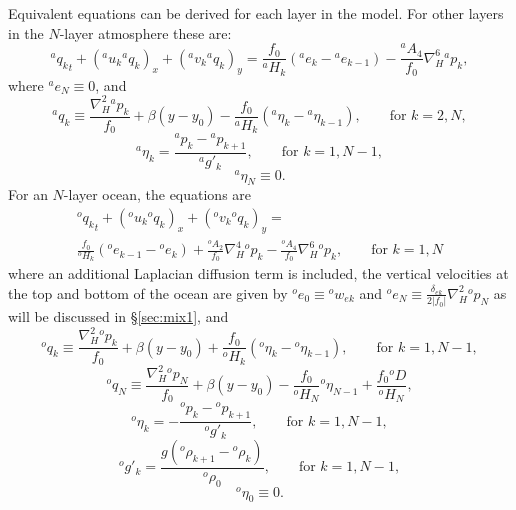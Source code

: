 \documentclass[11pt, a4paper,twoside]{article}
\newcommand{\etb}[2]{{{}^{#1}\eta_{#2}}}
\newcommand{\rhb}[1]{{{}^{#1}\rho}}
\newcommand{\gp}[2]{{}^{#1}g'_{#2}}
\newcommand{\q}[2]{{{}^{#1}q_{#2}}}
\newcommand{\p}[2]{{{}^{#1}p_{#2}}}
\newcommand{\uu}[2]{{{}^{#1}u_{#2}}}
\newcommand{\vv}[2]{{{}^{#1}v_{#2}}}
\newcommand{\ek}[1]{{{}^{#1}w_{ek}}}
\newcommand{\HH}[2]{{{}^{#1}H_{#2}}}
\newcommand{\at}[1]{{{}^{#1}A_2}}
\newcommand{\ah}[1]{{{}^{#1}A_4}}
\newcommand{\e}[2]{{{}^{#1}e_{#2}}}
\newcommand{\D}[1]{{}^{#1}D}
\newcommand{\delek}[0]{\delta_{ek}}
\numberwithin{equation}{section}
\begin{document}
Equivalent equations can be derived for each layer in the model.
For other layers in the $N$-layer atmosphere these are:
\begin{equation}\label{eq:momxra}
\q{a}{k}_t  + (\uu{a}{k} \q{a}{k})_x  + (\vv{a}{k} \q{a}{k})_y   = \frac{f_0}{\HH{a}{k}}( \e{a}{k}- \e{a}{k-1})  - \frac{\ah{a}}{f_0}\nabla_H^6 \p{a}{k},
\end{equation}
where $\e{a}{N} \equiv 0$, and
\begin{equation}
\q{a}{k} \equiv \frac{\nabla_H^2 \p{a}{k}}{f_0} + \beta(y-y_0) - \frac{ f_0  }{\HH{a}{k}}(\etb{a}{k} - \etb{a}{k-1}), \quad \quad \textrm{for } k=2,N,
\end{equation}
\begin{equation}
\etb{a}{k} =   \frac{\p{a}{k}-\p{a}{k+1}}{\gp{a}{k}}, \quad \quad \textrm{for } k=1,N-1,
\end{equation}
\begin{equation}
\etb{a}{N} \equiv  0.
\end{equation}
For an $N$-layer ocean, the equations are
\begin{multline}\label{eq:momxn1}
\q{o}{k}_t  + (\uu{o}{k} \q{o}{k})_x  + (\vv{o}{k} \q{o}{k})_y = \\
\frac{f_0 }{\HH{o}{k}}(\e{o}{k-1} - \e{o}{k}) + \frac{\at{o}}{f_0}\nabla_H^4 \p{o}{k}  - \frac{\ah{o}}{f_0}\nabla_H^6 \p{o}{k}, \quad \quad \textrm{for } k=1,N
\end{multline}
where an additional Laplacian diffusion term is included, the vertical velocities at the top and bottom of the ocean are given by $\e{o}{0} \equiv \ek{o} $ and  $\e{o}{N} \equiv \frac{\delek}{2 \lvert f_0 \rvert} \nabla_H^2\p{o}{N}$ as will be discussed in \S\ref{sec:mix1}, and
\begin{equation}
\q{o}{k} \equiv \frac{\nabla_H^2 \p{o}{k}}{f_0} + \beta(y-y_0) + \frac{ f_0}{\HH{o}{k}}( \etb{o}{k} - \etb{o}{k-1}), \quad \quad \textrm{for } k=1,N-1,
\end{equation}
\begin{equation}
\q{o}{N} \equiv \frac{\nabla_H^2 \p{o}{N}}{f_0} + \beta(y-y_0) - \frac{ f_0}{\HH{o}{N}} \etb{o}{N-1} + \frac{f_0 \D{o}}{\HH{o}{N}},
\end{equation}
\begin{equation}\label{eq:etbk}
\etb{o}{k} =  - \frac{\p{o}{k}-\p{o}{k+1}}{\gp{o}{k}}, \quad \quad \textrm{for } k=1,N-1,
\end{equation}
\[\gp{o}{k} = \frac{g(\rhb{o}_{k+1} - \rhb{o}_{k})}{\rhb{o}_0},\quad \quad \textrm{for } k=1,N-1,\]
\[\etb{o}{0} \equiv 0.\]
\end{document}
